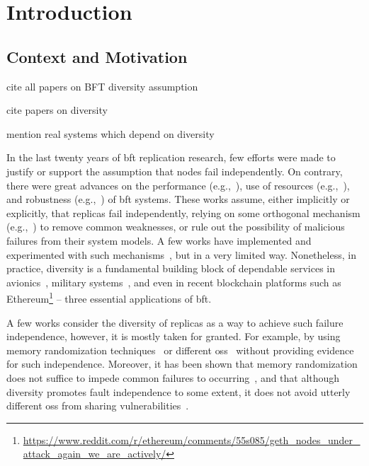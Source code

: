 \chapter{Introduction}
\label{chap:introduction}

\section{Context and Motivation}

cite all papers on BFT diversity assumption

cite papers on diversity 

mention real systems which depend on diversity

In the last twenty years of \gls{bft} replication research, few efforts were made to justify or support the assumption that nodes fail independently. 
On contrary, there were great advances on the performance (e.g.,~\cite{Kotla:2010,Aublin:2015,Behl:2015}), use of resources (e.g.,~\cite{Yin:2003,Veronese:2013,Liu:2016,Behl:2017}), and robustness (e.g.,~\cite{Amir:2011,Bessani:2014,Clement:2009b}) of \gls{bft} systems.
These works assume, either implicitly or explicitly, that replicas fail independently, relying on some orthogonal mechanism (e.g.,~\cite{Roeder:2010,Chen:1995}) to remove common weaknesses, or rule out the possibility of malicious failures from their system models.
A few works have implemented and experimented with such mechanisms~\cite{Rodrigues:2001,Roeder:2010,Amir:2011}, but in a very limited way.
Nonetheless, in practice, diversity is a fundamental building block of dependable services in avionics~\cite{Yeh:2004}, military systems~\cite{rhimes}, and even in recent blockchain platforms such as Ethereum\footnote{\url{https://www.reddit.com/r/ethereum/comments/55s085/geth_nodes_under_attack_again_we_are_actively/}} -- three essential applications of \gls{bft}. 

A few works consider the diversity of replicas as a way to achieve such failure independence, however, it is mostly taken for granted.
For example, by using memory randomization techniques~\cite{Roeder:2010} or different \glspl{os}~\cite{Rodrigues:2001,Junqueira:2005} without providing evidence for such independence. 
Moreover, it has been shown that memory randomization does not suffice to impede common failures to occurring~\cite{Snow:2013,Bittau:2014}, and that although diversity promotes fault independence to some extent, it does not avoid utterly different \glspl{os} from sharing vulnerabilities~\cite{Garcia:2014}.

